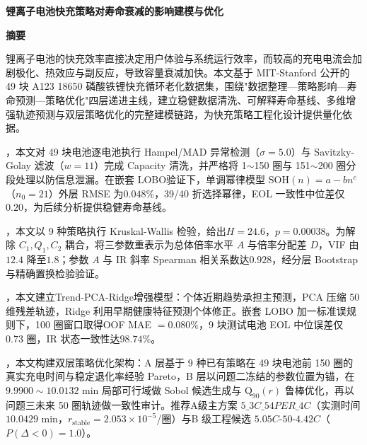 \documentclass[12pt,a4paper]{article}
\newcommand{\titlefont}{\fontsize{16pt}{20pt}\selectfont\heiti\bfseries}
\newcommand{\sectiontitlefont}{\fontsize{14pt}{18pt}\selectfont\heiti\bfseries}
\newcommand{\bodyfont}{\fontsize{12pt}{16pt}\selectfont\songti}
\newcommand{\paperstrong}[1]{{\heiti #1}}
\begin{document}
\label{body:start}

\begin{center}
\vspace*{0.6cm}
{\titlefont 锂离子电池快充策略对寿命衰减的影响建模与优化\par}
\vspace{0.4cm}
\end{center}

\begin{center}
{\sectiontitlefont 摘要}
\end{center}

\vspace{0.3cm}
\bodyfont

\indent 锂离子电池的快充效率直接决定用户体验与系统运行效率，而较高的充电电流会加剧极化、热效应与副反应，导致容量衰减加快。本文基于 MIT-Stanford 公开的 49 块 A123 18650 磷酸铁锂快充循环老化数据集，围绕"数据整理—策略影响—寿命预测—策略优化"四层递进主线，建立稳健数据清洗、可解释寿命基线、多维增强轨迹预测与双层策略优化的完整建模链路，为快充策略工程化设计提供量化依据。

\indent \paperstrong{针对问题一}，本文对 49 块电池逐电池执行 Hampel/MAD 异常检测（$\sigma=5.0$）与 Savitzky-Golay 滤波（$w=11$）完成 Capacity 清洗，并严格将 1$\sim$150 圈与 151$\sim$200 圈分段处理以防信息泄漏。在\paperstrong{嵌套 LOBO}验证下，\paperstrong{单调幂律}模型 $\mathrm{SOH}(n)=a-bn^c$（$n_0=21$）外层 RMSE 为\paperstrong{$0.048\%$}，39/40 折选择幂律，EOL 一致性中位差仅 $0.20$，为后续分析提供稳健寿命基线。

\indent \paperstrong{针对问题二}，本文以 9 种策略执行 Kruskal-Wallis 检验，给出\paperstrong{$H=24.6$，$p=0.00038$}。为解除 $C_1,Q_1,C_2$ 耦合，将三参数重表示为总体倍率水平 $A$ 与倍率分配差 $D$，VIF 由 $12.4$ 降至\paperstrong{$1.8$}；参数 $A$ 与 IR 斜率 Spearman 相关系数达\paperstrong{$0.928$}，经分层 Bootstrap 与精确置换检验验证。

\indent \paperstrong{针对问题三}，本文建立\paperstrong{Trend-PCA-Ridge}增强模型：个体近期趋势承担主预测，PCA 压缩 50 维残差轨迹，Ridge 利用早期健康特征预测个体修正。嵌套 LOBO 加一标准误规则下，100 圈窗口取得\paperstrong{OOF MAE $=0.080\%$}，9 块测试电池 EOL 中位误差仅 $0.73$ 圈，IR 状态一致性达\paperstrong{$98.74\%$}。

\indent \paperstrong{针对问题四}，本文构建\paperstrong{双层策略优化架构}：A 层基于 9 种已有策略在 49 块电池前 150 圈的真实充电时间与稳定退化率经验 Pareto，B 层以问题二冻结的参数位置为锚，在 $9.9900\sim10.0132$ min 局部可行域做 Sobol 候选生成与 $\mathrm{Q}_{90}(r)$ 鲁棒优化，再以问题三未来 50 圈轨迹做一致性审计。推荐\paperstrong{A级主方案 $5\_3C\_54PER\_4C$}（实测时间 $10.0429$ min，$r_\text{stable}=2.053\times10^{-5}$/圈）与\paperstrong{B 级工程候选 $5.05C$-$50$-$4.42C$}（$P(\Delta<0)=1.0$）。
\end{document}
